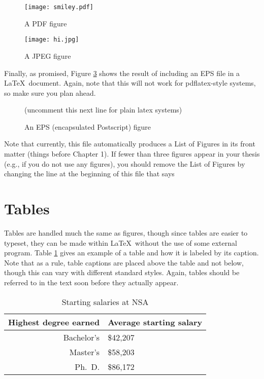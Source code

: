 \documentclass[modernstyle,12pt]{sjsuthesis}
\theoremstyle{definition}
\begin{document}
\begin{figure}[htbp]\centering
  \texttt{[image: smiley.pdf]}
  \caption{A PDF figure}
  \label{f:smileypdf}
\end{figure}

\begin{figure}[htbp]\centering
  \texttt{[image: hi.jpg]}
  \caption{A JPEG figure}
  \label{f:hijpg}
\end{figure}

Finally, as promised, Figure \ref{f:smileyeps} shows the result of
including an EPS file in a \LaTeX\ document.  Again, note that this
will not work for pdflatex-style systems, so make sure you plan ahead.

\begin{figure}[htbp]\centering
  (uncomment this next line for plain latex systems)
  \caption{An EPS (encapsulated Postscript) figure}
  \label{f:smileyeps}
\end{figure}

Note that currently, this file automatically produces a List of
Figures in its front matter (things before Chapter 1).  If fewer than
three figures appear in your thesis (e.g., if you do not use any
figures), you should remove the List of Figures by changing the line
at the beginning of this file that says
\verb@%\emptyLoF@ to \verb@\emptyLoF@.



\section{Tables}
\label{sect:tables}

Tables are handled much the same as figures, though since tables are
easier to typeset, they can be made within \LaTeX\ without the use of
some external program.  Table \ref{tab:NSA} gives an example of a
table and how it is labeled by its caption.  Note that as a rule,
table captions are placed above the table and not below, though this
can vary with different standard styles.  Again, tables should be
referred to in the text soon before they actually appear.

\begin{table}[htbp]\centering
  \caption{Starting salaries at NSA}
  \label{tab:NSA}
  \begin{tabular}{|r|l|} \hline
    Highest degree earned & Average starting salary \\ \hline\hline
    Bachelor's & \$42,207 \\
    Master's & \$58,203 \\
    Ph.\ D. & \$86,172 \\ \hline
  \end{tabular}
\end{table}
\end{document}
